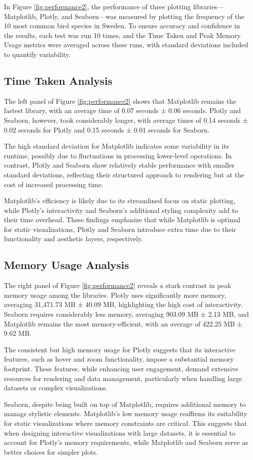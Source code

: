 In Figure \ref{fig:performance2}, the performance of three plotting libraries—Matplotlib, Plotly, and Seaborn—was measured by plotting the frequency of the 10 most common bird species in Sweden. To ensure accuracy and confidence in the results, each test was run 10 times, and the Time Taken and Peak Memory Usage metrics were averaged across these runs, with standard deviations included to quantify variability.

\subsection{Time Taken Analysis}

The left panel of Figure \ref{fig:performance2} shows that Matplotlib remains the fastest library, with an average time of 0.07 seconds ± 0.06 seconds. Plotly and Seaborn, however, took considerably longer, with average times of 0.14 seconds ± 0.02 seconds for Plotly and 0.15 seconds ± 0.01 seconds for Seaborn.

The high standard deviation for Matplotlib indicates some variability in its runtime, possibly due to fluctuations in processing lower-level operations. In contrast, Plotly and Seaborn show relatively stable performance with smaller standard deviations, reflecting their structured approach to rendering but at the cost of increased processing time.

Matplotlib's efficiency is likely due to its streamlined focus on static plotting, while Plotly's interactivity and Seaborn's additional styling complexity add to their time overhead. These findings emphasize that while Matplotlib is optimal for static visualizations, Plotly and Seaborn introduce extra time due to their functionality and aesthetic layers, respectively.

\subsection{Memory Usage Analysis}

The right panel of Figure \ref{fig:performance2} reveals a stark contrast in peak memory usage among the libraries. Plotly uses significantly more memory, averaging 31,471.73 MB ± 40.09 MB, highlighting the high cost of interactivity. Seaborn requires considerably less memory, averaging 903.09 MB ± 2.13 MB, and Matplotlib remains the most memory-efficient, with an average of 422.25 MB ± 9.62 MB.

The consistent but high memory usage for Plotly suggests that its interactive features, such as hover and zoom functionality, impose a substantial memory footprint. These features, while enhancing user engagement, demand extensive resources for rendering and data management, particularly when handling large datasets or complex visualizations.

Seaborn, despite being built on top of Matplotlib, requires additional memory to manage stylistic elements. Matplotlib's low memory usage reaffirms its suitability for static visualizations where memory constraints are critical. This suggests that when designing interactive visualizations with large datasets, it is essential to account for Plotly's memory requirements, while Matplotlib and Seaborn serve as better choices for simpler plots.